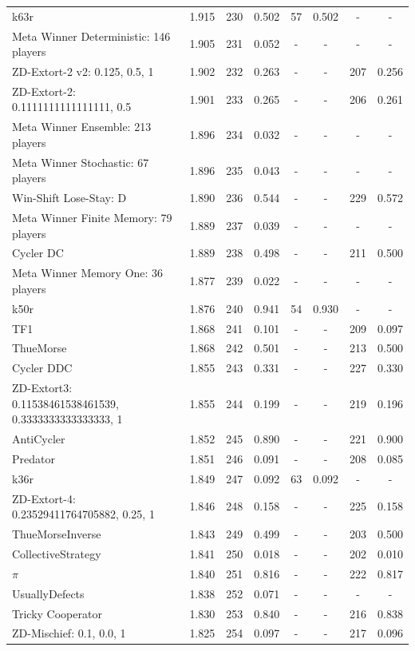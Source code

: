 \begin{tabular}{lccccccc}
k63r & 1.915 & 230 & 0.502 & 57 & 0.502 & - & - \\
Meta Winner Deterministic: 146 players & 1.905 & 231 & 0.052 & - & - & - & - \\
ZD-Extort-2 v2: 0.125, 0.5, 1 & 1.902 & 232 & 0.263 & - & - & 207 & 0.256 \\
ZD-Extort-2: 0.1111111111111111, 0.5 & 1.901 & 233 & 0.265 & - & - & 206 & 0.261 \\
Meta Winner Ensemble: 213 players & 1.896 & 234 & 0.032 & - & - & - & - \\
Meta Winner Stochastic: 67 players & 1.896 & 235 & 0.043 & - & - & - & - \\
Win-Shift Lose-Stay: D & 1.890 & 236 & 0.544 & - & - & 229 & 0.572 \\
Meta Winner Finite Memory: 79 players & 1.889 & 237 & 0.039 & - & - & - & - \\
Cycler DC & 1.889 & 238 & 0.498 & - & - & 211 & 0.500 \\
Meta Winner Memory One: 36 players & 1.877 & 239 & 0.022 & - & - & - & - \\
k50r & 1.876 & 240 & 0.941 & 54 & 0.930 & - & - \\
TF1 & 1.868 & 241 & 0.101 & - & - & 209 & 0.097 \\
ThueMorse & 1.868 & 242 & 0.501 & - & - & 213 & 0.500 \\
Cycler DDC & 1.855 & 243 & 0.331 & - & - & 227 & 0.330 \\
ZD-Extort3: 0.11538461538461539, 0.3333333333333333, 1 & 1.855 & 244 & 0.199 & - & - & 219 & 0.196 \\
AntiCycler & 1.852 & 245 & 0.890 & - & - & 221 & 0.900 \\
Predator & 1.851 & 246 & 0.091 & - & - & 208 & 0.085 \\
k36r & 1.849 & 247 & 0.092 & 63 & 0.092 & - & - \\
ZD-Extort-4: 0.23529411764705882, 0.25, 1 & 1.846 & 248 & 0.158 & - & - & 225 & 0.158 \\
ThueMorseInverse & 1.843 & 249 & 0.499 & - & - & 203 & 0.500 \\
CollectiveStrategy & 1.841 & 250 & 0.018 & - & - & 202 & 0.010 \\
$\pi$ & 1.840 & 251 & 0.816 & - & - & 222 & 0.817 \\
UsuallyDefects & 1.838 & 252 & 0.071 & - & - & - & - \\
Tricky Cooperator & 1.830 & 253 & 0.840 & - & - & 216 & 0.838 \\
ZD-Mischief: 0.1, 0.0, 1 & 1.825 & 254 & 0.097 & - & - & 217 & 0.096 \\

\end{tabular}
